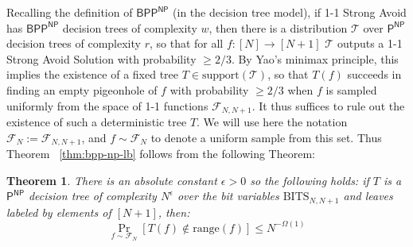 \documentclass[11pt]{article}
\newtheorem{theorem}{Theorem}
\newcommand{\rng}{\mathrm{range}}
\begin{document}
\medskip
Recalling the definition of $\mathsf{BPP^{NP}}$ (in the decision tree model), if 1-1 Strong Avoid has $\mathsf{BPP^{NP}}$ decision trees of complexity $w$, then there is a distribution $\mathcal{T}$ over $\mathsf{P^{NP}}$ decision trees of complexity $r$, so that for all $f: [N] \to [N+1]$ $\mathcal{T}$ outputs a 1-1 Strong Avoid Solution with probability $\geq 2/3$. By Yao's minimax principle, this implies the existence of a fixed tree $T \in \mathrm{support}(\mathcal{T})$, so that $T(f)$ succeeds in finding an empty pigeonhole of $f$ with probability $\geq 2/3$ when $f$ is sampled uniformly from the space of 1-1 functions $\mathcal{F}_{N,N+1}$. It thus suffices to rule out the existence of such a deterministic tree $T$. We will use here the notation $\mathcal{F}_N := \mathcal{F}_{N,N+1}$, and $f \sim \mathcal{F}_N$ to denote a uniform sample from this set. Thus Theorem ~\ref{thm:bpp-np-lb} follows from the following Theorem:

\begin{theorem}\label{thm:bpp-np-lb-dt}
There is an absolute constant $\epsilon > 0$ so the following holds: if $T$ is a $\mathsf{P^{NP}}$ decision tree of complexity $N^{\epsilon}$ over the bit variables $\mathrm{BITS}_{N,N+1}$ and leaves labeled by elements of $[N+1]$, then:
\[
\Pr_{f \sim \mathcal{F}_N} [T(f) \notin \rng(f)] \leq N^{-\Omega(1)}
\]

\end{theorem}
\end{document}
